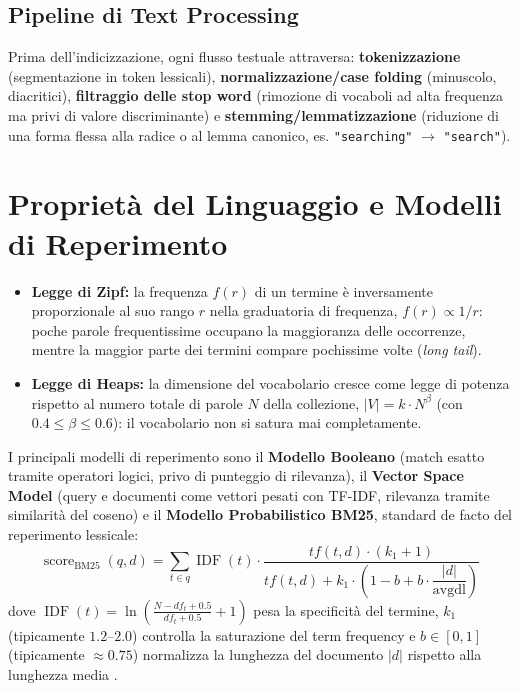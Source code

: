 \subsection{Pipeline di Text Processing}
Prima dell'indicizzazione, ogni flusso testuale attraversa: \textbf{tokenizzazione} (segmentazione in token lessicali), \textbf{normalizzazione/case folding} (minuscolo, diacritici), \textbf{filtraggio delle stop word} (rimozione di vocaboli ad alta frequenza ma privi di valore discriminante) e \textbf{stemming/lemmatizzazione} (riduzione di una forma flessa alla radice o al lemma canonico, es. \texttt{"searching"} $\to$ \texttt{"search"}).

\FloatBarrier
\section{Propriet\`a del Linguaggio e Modelli di Reperimento}

\begin{itemize}
    \item \textbf{Legge di Zipf:} la frequenza $f(r)$ di un termine \`e inversamente proporzionale al suo rango $r$ nella graduatoria di frequenza, $f(r) \propto 1/r$: poche parole frequentissime occupano la maggioranza delle occorrenze, mentre la maggior parte dei termini compare pochissime volte (\textit{long tail}).
    \item \textbf{Legge di Heaps:} la dimensione del vocabolario cresce come legge di potenza rispetto al numero totale di parole $N$ della collezione, $|V| = k \cdot N^\beta$ (con $0.4 \le \beta \le 0.6$): il vocabolario non si satura mai completamente.
\end{itemize}

I principali modelli di reperimento sono il \textbf{Modello Booleano} (match esatto tramite operatori logici, privo di punteggio di rilevanza), il \textbf{Vector Space Model} (query e documenti come vettori pesati con TF-IDF, rilevanza tramite similarit\`a del coseno) e il \textbf{Modello Probabilistico BM25}, standard de facto del reperimento lessicale:
\begin{equation}
\operatorname{score}_{\text{BM25}}(q, d) = \sum_{t \in q} \operatorname{IDF}(t) \cdot \frac{tf(t, d) \cdot (k_1 + 1)}{tf(t, d) + k_1 \cdot \left(1 - b + b \cdot \dfrac{|d|}{\text{avgdl}}\right)}
\label{eq:bm25-formula}
\end{equation}
dove $\operatorname{IDF}(t) = \ln\!\left(\frac{N - df_t + 0.5}{df_t + 0.5} + 1\right)$ pesa la specificit\`a del termine, $k_1$ (tipicamente $1.2$--$2.0$) controlla la saturazione del term frequency e $b \in [0,1]$ (tipicamente $\approx 0.75$) normalizza la lunghezza del documento $|d|$ rispetto alla lunghezza media .

